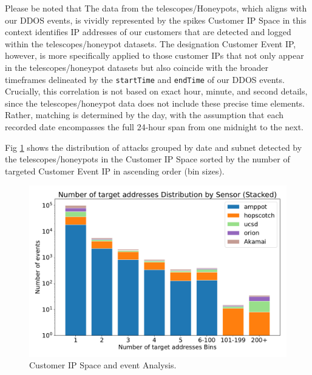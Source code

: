 Please be noted that The data from the telescopes/Honeypots, which aligns with our DDOS events, is vividly represented by the spikes Customer IP Space in this context identifies IP addresses of our customers that are detected and logged within the telescopes/honeypot datasets. 
The designation Customer Event IP, however, is more specifically applied to those customer IPs that not only appear in the telescopes/honeypot datasets but also coincide with the broader timeframes delineated by the \texttt{startTime} and \texttt{endTime} of our DDOS events. Crucially, this correlation is not based on exact hour, minute, and second details, since the telescopes/honeypot data does not include these precise time elements. Rather, matching is determined by the day, with the assumption that each recorded date encompasses the full 24-hour span from one midnight to the next.

Fig \ref{fig:akamai_spikes} shows the distribution of attacks grouped by date and subnet detected by the telescopes/honeypots in the Customer IP Space sorted by the number of targeted Customer Event IP in ascending order (bin sizes).
\begin{figure}[htbp]
    \centering
    \includegraphics[scale=0.48]{graphs/bins.pdf}
    \caption{Customer IP Space and event Analysis.}
    \label{fig:akamai_spikes}
\end{figure}